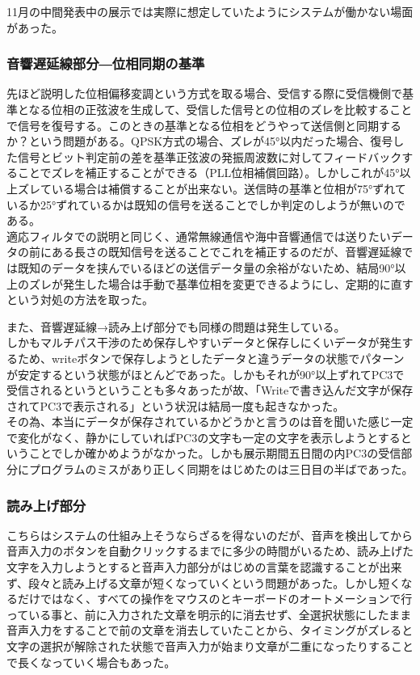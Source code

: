 \documentclass[a4paper,report]{jsbook}
\begin{document}
11月の中間発表中の展示では実際に想定していたようにシステムが働かない場面があった。

\subsubsection{音響遅延線部分―位相同期の基準}\label{ux97f3ux97ffux9045ux5ef6ux7ddaux90e8ux5206ux4f4dux76f8ux540cux671fux306eux57faux6e96}

先ほど説明した位相偏移変調という方式を取る場合、受信する際に受信機側で基準となる位相の正弦波を生成して、受信した信号との位相のズレを比較することで信号を復号する。このときの基準となる位相をどうやって送信側と同期するか？という問題がある。QPSK方式の場合、ズレが45°以内だった場合、復号した信号とビット判定前の差を基準正弦波の発振周波数に対してフィードバックすることでズレを補正することができる（PLL位相補償回路）。しかしこれが45°以上ズレている場合は補償することが出来ない。送信時の基準と位相が75°ずれているか25°ずれているかは既知の信号を送ることでしか判定のしようが無いのである。\\
適応フィルタでの説明と同じく、通常無線通信や海中音響通信では送りたいデータの前にある長さの既知信号を送ることでこれを補正するのだが、音響遅延線では既知のデータを挟んでいるほどの送信データ量の余裕がないため、結局90°以上のズレが発生した場合は手動で基準位相を変更できるようにし、定期的に直すという対処の方法を取った。

また、音響遅延線→読み上げ部分でも同様の問題は発生している。\\
しかもマルチパス干渉のため保存しやすいデータと保存しにくいデータが発生するため、writeボタンで保存しようとしたデータと違うデータの状態でパターンが安定するという状態がほとんどであった。しかもそれが90°以上ずれてPC3で受信されるというということも多々あったが故、「Writeで書き込んだ文字が保存されてPC3で表示される」という状況は結局一度も起きなかった。\\
その為、本当にデータが保存されているかどうかと言うのは音を聞いた感じ一定で変化がなく、静かにしていればPC3の文字も一定の文字を表示しようとするということでしか確かめようがなかった。しかも展示期間五日間の内PC3の受信部分にプログラムのミスがあり正しく同期をはじめたのは三日目の半ばであった。

\subsubsection{読み上げ部分}\label{ux8aadux307fux4e0aux3052ux90e8ux5206}

こちらはシステムの仕組み上そうならざるを得ないのだが、音声を検出してから音声入力のボタンを自動クリックするまでに多少の時間がいるため、読み上げた文字を入力しようとすると音声入力部分がはじめの言葉を認識することが出来ず、段々と読み上げる文章が短くなっていくという問題があった。しかし短くなるだけではなく、すべての操作をマウスのとキーボードのオートメーションで行っている事と、前に入力された文章を明示的に消去せず、全選択状態にしたまま音声入力をすることで前の文章を消去していたことから、タイミングがズレると文字の選択が解除された状態で音声入力が始まり文章が二重になったりすることで長くなっていく場合もあった。
\end{document}

